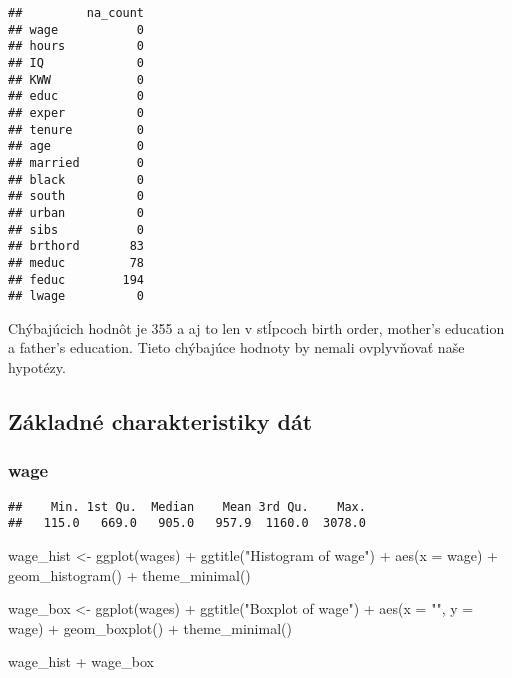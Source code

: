 \documentclass[
]{article}
\newenvironment{Shaded}{\begin{snugshade}}{\end{snugshade}}
\newcommand{\AttributeTok}[1]{\textcolor[rgb]{0.77,0.63,0.00}{#1}}
\newcommand{\FunctionTok}[1]{\textcolor[rgb]{0.00,0.00,0.00}{#1}}
\newcommand{\NormalTok}[1]{#1}
\newcommand{\OtherTok}[1]{\textcolor[rgb]{0.56,0.35,0.01}{#1}}
\newcommand{\SpecialCharTok}[1]{\textcolor[rgb]{0.00,0.00,0.00}{#1}}
\newcommand{\StringTok}[1]{\textcolor[rgb]{0.31,0.60,0.02}{#1}}
\begin{document}
\begin{verbatim}
##         na_count
## wage           0
## hours          0
## IQ             0
## KWW            0
## educ           0
## exper          0
## tenure         0
## age            0
## married        0
## black          0
## south          0
## urban          0
## sibs           0
## brthord       83
## meduc         78
## feduc        194
## lwage          0
\end{verbatim}

Chýbajúcich hodnôt je 355 a aj to len v stĺpcoch birth order, mother's
education a father's education. Tieto chýbajúce hodnoty by nemali
ovplyvňovať naše hypotézy.

\hypertarget{zuxe1kladnuxe9-charakteristiky-duxe1t}{%
\subsection{Základné charakteristiky
dát}\label{zuxe1kladnuxe9-charakteristiky-duxe1t}}

\hypertarget{wage}{%
\subsubsection{wage}\label{wage}}

\begin{Shaded}
\end{Shaded}

\begin{verbatim}
##    Min. 1st Qu.  Median    Mean 3rd Qu.    Max. 
##   115.0   669.0   905.0   957.9  1160.0  3078.0
\end{verbatim}

\begin{Shaded}
\begin{Highlighting}[]
\NormalTok{wage\_hist }\OtherTok{\textless{}{-}} \FunctionTok{ggplot}\NormalTok{(wages) }\SpecialCharTok{+} \FunctionTok{ggtitle}\NormalTok{(}\StringTok{"Histogram of wage"}\NormalTok{) }\SpecialCharTok{+} \FunctionTok{aes}\NormalTok{(}\AttributeTok{x =}\NormalTok{ wage) }\SpecialCharTok{+} \FunctionTok{geom\_histogram}\NormalTok{() }\SpecialCharTok{+} \FunctionTok{theme\_minimal}\NormalTok{()}

\NormalTok{wage\_box }\OtherTok{\textless{}{-}} \FunctionTok{ggplot}\NormalTok{(wages) }\SpecialCharTok{+} \FunctionTok{ggtitle}\NormalTok{(}\StringTok{"Boxplot of wage"}\NormalTok{) }\SpecialCharTok{+} \FunctionTok{aes}\NormalTok{(}\AttributeTok{x =} \StringTok{""}\NormalTok{, }\AttributeTok{y =}\NormalTok{ wage) }\SpecialCharTok{+} \FunctionTok{geom\_boxplot}\NormalTok{() }\SpecialCharTok{+} \FunctionTok{theme\_minimal}\NormalTok{()}

\NormalTok{wage\_hist }\SpecialCharTok{+}\NormalTok{ wage\_box}
\end{Highlighting}
\end{Shaded}
\end{document}
